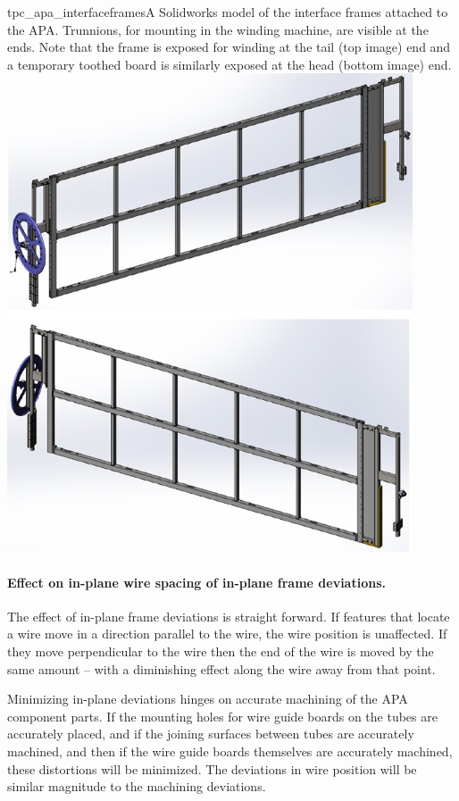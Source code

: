 \begin{cdrfigure}{tpc_apa_interfaceframes}{A Solidworks model of the interface frames attached to the APA. Trunnions, for mounting in the winding machine, are visible at the ends. Note that the frame is exposed for winding at the tail (top image) end and a temporary toothed board is similarly exposed at the head (bottom image) end.}
\includegraphics[width=0.9\textwidth]{figures/tpc_apa_interfaceframes.png} 
\end{cdrfigure}

\paragraph{Effect on in-plane wire spacing of in-plane frame deviations.}

The effect of in-plane frame deviations is straight forward.  If features that locate a wire move in a direction parallel to the wire, the wire position is unaffected. If they move perpendicular to the wire then the end of the wire is moved by the same amount -- with a diminishing effect along the wire away from that point.  

Minimizing in-plane deviations hinges on accurate machining of the APA component parts.  If the mounting holes for wire guide boards on the tubes are accurately placed, and if the joining surfaces between tubes are accurately machined, and then if the wire guide boards themselves are accurately machined, these distortions will be minimized.  The deviations in wire position will be similar magnitude to the machining deviations.

